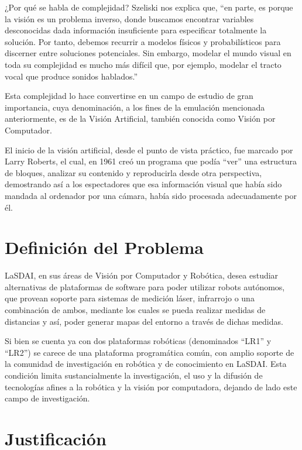 ¿Por qué se habla de complejidad? Szeliski nos explica que, ``en parte, es porque la visión es un problema inverso, donde buscamos encontrar variables desconocidas dada información insuficiente para especificar totalmente la solución. Por tanto, debemos recurrir a modelos físicos y probabilísticos para discerner entre soluciones potenciales. Sin embargo, modelar el mundo visual en toda su complejidad es mucho más difícil que, por ejemplo, modelar el tracto vocal que produce sonidos hablados.'' \citep{RS:09}

Esta complejidad lo hace convertirse en un campo de estudio de gran importancia, cuya denominación, a los fines de la emulación mencionada anteriormente, es de la Visión Artificial, también conocida como Visión por Computador.

El inicio de la visión artificial, desde el punto de vista práctico, fue marcado por Larry Roberts, el cual, en 1961 creó un programa que podía ``ver'' una estructura de bloques, analizar su contenido y reproducirla desde otra perspectiva, demostrando así a los espectadores que esa información visual que había sido mandada al ordenador por una cámara, había sido procesada adecuadamente por él. \citep{bb68865}

\section{Definición del Problema}

LaSDAI, en sus áreas de Visión por Computador y Robótica, desea estudiar alternativas de plataformas de software para poder utilizar robots autónomos, que provean soporte para sistemas de medición láser, infrarrojo o una combinación de ambos, mediante los cuales se pueda realizar medidas de distancias y así, poder generar mapas del entorno a través de dichas medidas.

Si bien se cuenta ya con dos plataformas robóticas (denominados ``LR1'' y ``LR2'') se carece de una plataforma programática común, con amplio soporte de la comunidad de investigación en robótica y de conocimiento en LaSDAI\@. Esta condición limita sustancialmente la investigación, el uso y la difusión de tecnologías afines a la robótica y la visión por computadora, dejando de lado este campo de investigación.

\section{Justificación}

